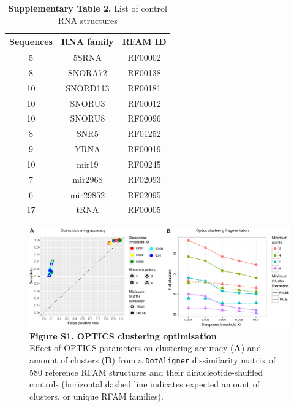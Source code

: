 \documentclass{bmcart}
\newcommand\dotaligner{\texttt{DotAligner}}
\begin{document}
\begin{table}
\centering
\caption*{\textbf{Supplementary Table 2.}  List of control RNA structures }
\begin{tabular}{ccc}
\hline
Sequences & RNA family & RFAM ID \\
\hline
   5 & 5SRNA & RF00002 \\
   8 & SNORA72 & RF00138 \\
  10 & SNORD113 & RF00181\\
  10 & SNORU3 & RF00012\\
  10 & SNORU8 & RF00096\\
   8 & SNR5 & RF01252\\
   9 & YRNA & RF00019\\
  10 & mir19 & RF00245\\
   7 & mir2968 & RF02093\\
   6 & mir29852 & RF02095\\
  17 & tRNA & RF00005\\
\hline
\end{tabular}
\end{table}

\begin{figure}
 \includegraphics[width=\textwidth]{SF1}
 \caption*{ \textbf{ Figure S1. OPTICS clustering optimisation }\\
Effect of OPTICS parameters on clustering accuracy (\textbf{A}) and amount 
 of clusters (\textbf{B}) from a \dotaligner{} dissimilarity matrix of 580 reference RFAM 
 structures and their dinucleotide-shuffled controls (horizontal dashed line indicates 
 expected amount of clusters, or unique RFAM families). }
\end{figure}
\end{document}
